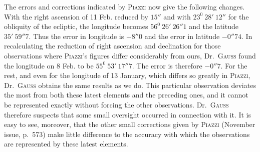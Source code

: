 The errors and corrections indicated by \textsc{Piazzi} now give the following changes. With the right ascension of 11 Feb. reduced by $15''$ and with $23^0\ 28'\ 12''$ for the obliquity of the ecliptic, the longitude becomes $56^0\ 26'\ 26''1$ and the latitude $35'\ 59''7$. Thus the error in longitude is $+8''0$ and the error in latitude $-0''74$. In recalculating the reduction of right ascension and declination for those observations where \textsc{Piazzi}'s figures differ considerably from ours, Dr.\ \textsc{Gauss} found the longitude on 8 Feb. to be $55^0\ 53'\ 17''7$. The error is therefore $-0''7$. For the rest, and even for the longitude of 13 January, which differs so greatly in \textsc{Piazzi}, Dr.\ \textsc{Gauss} obtains the same results as we do. This particular observation deviates the most from both these latest elements and the preceding ones, and it cannot be represented exactly without forcing the other observations. Dr.\ \textsc{Gauss} therefore suspects that some small oversight occurred in connection with it. It is easy to see, moreover, that the other small corrections given by \textsc{Piazzi} (November issue, p.\ 573) make little difference to the accuracy with which the observations are represented by these latest elements.

